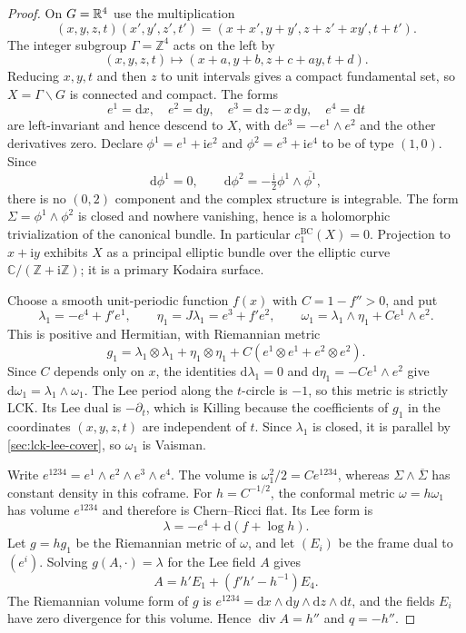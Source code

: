 \begin{proof}
On $G=\mathbb R^4$ use the multiplication
\[
 (x,y,z,t)(x',y',z',t')
   =(x+x',y+y',z+z'+xy',t+t').
\]
The integer subgroup $\Gamma=\mathbb Z^4$ acts on the left by
\[
 (x,y,z,t)\longmapsto(x+a,y+b,z+c+ay,t+d).
\]
Reducing $x,y,t$ and then $z$ to unit intervals gives a compact fundamental set, so $X=\Gamma\backslash G$ is connected and compact. The forms
\[
 e^1=\mathrm dx,\quad e^2=\mathrm dy,\quad
 e^3=\mathrm dz-x\,\mathrm dy,\quad e^4=\mathrm dt
\]
are left-invariant and hence descend to $X$, with $\mathrm de^3=-e^1\wedge e^2$ and the other derivatives zero. Declare $\phi^1=e^1+\mathrm i e^2$ and $\phi^2=e^3+\mathrm i e^4$ to be of type $(1,0)$. Since
\[
 \mathrm d\phi^1=0,\qquad
 \mathrm d\phi^2=-\tfrac{\mathrm i}{2}\phi^1\wedge\overline{\phi^1},
\]
there is no $(0,2)$ component and the complex structure is integrable. The form $\Sigma=\phi^1\wedge\phi^2$ is closed and nowhere vanishing, hence is a holomorphic trivialization of the canonical bundle. In particular $c_1^{\mathrm{BC}}(X)=0$. Projection to $x+\mathrm i y$ exhibits $X$ as a principal elliptic bundle over the elliptic curve $\mathbb C/(\mathbb Z+\mathrm i\mathbb Z)$; it is a primary Kodaira surface.

Choose a smooth unit-periodic function $f(x)$ with $C=1-f''>0$, and put
\[
 \lambda_1=-e^4+f'e^1,\qquad
 \eta_1=J\lambda_1=e^3+f'e^2,\qquad
 \omega_1=\lambda_1\wedge\eta_1+C e^1\wedge e^2.
\]
This is positive and Hermitian, with Riemannian metric
\[
 g_1=\lambda_1\otimes\lambda_1+\eta_1\otimes\eta_1
              +C(e^1\otimes e^1+e^2\otimes e^2).
\]
Since $C$ depends only on $x$, the identities $\mathrm d\lambda_1=0$ and $\mathrm d\eta_1=-C e^1\wedge e^2$ give $\mathrm d\omega_1=\lambda_1\wedge\omega_1$. The Lee period along the $t$-circle is $-1$, so this metric is strictly LCK. Its Lee dual is $-\partial_t$, which is Killing because the coefficients of $g_1$ in the coordinates $(x,y,z,t)$ are independent of $t$. Since $\lambda_1$ is closed, it is parallel by \cref{sec:lck-lee-cover}, so $\omega_1$ is Vaisman.

Write $e^{1234}=e^1\wedge e^2\wedge e^3\wedge e^4$. The volume is $\omega_1^2/2=C e^{1234}$, whereas $\Sigma\wedge\overline\Sigma$ has constant density in this coframe. For $h=C^{-1/2}$, the conformal metric $\omega=h\omega_1$ has volume $e^{1234}$ and therefore is Chern--Ricci flat. Its Lee form is
\[
 \lambda=-e^4+\mathrm d(f+\log h).
\]
Let $g=hg_1$ be the Riemannian metric of $\omega$, and let $(E_i)$ be the frame dual to $(e^i)$. Solving $g(A,\cdot)=\lambda$ for the Lee field $A$ gives
\[
 A=h'E_1+(f'h'-h^{-1})E_4.
\]
The Riemannian volume form of $g$ is $e^{1234}=\mathrm dx\wedge\mathrm dy\wedge\mathrm dz\wedge\mathrm dt$, and the fields $E_i$ have zero divergence for this volume. Hence $\operatorname{div}A=h''$ and $q=-h''$.


\end{proof}
